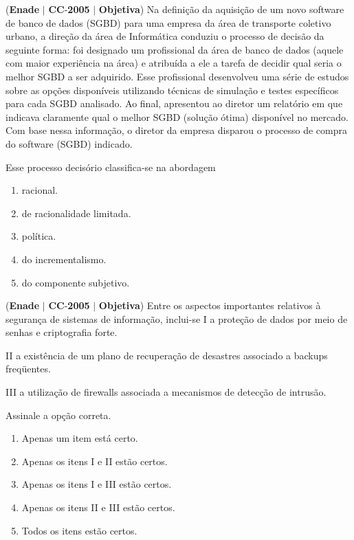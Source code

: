 \documentclass{exam}
\begin{document}
\begin{questions}
\question (\textbf{Enade} $|$ \textbf{CC}-\textbf{2005} $|$ \textbf{Objetiva})
Na definição da aquisição de um novo software de
banco de dados (SGBD) para uma empresa da área de
transporte coletivo urbano, a direção da área de Informática
conduziu o processo de decisão da seguinte forma: foi
designado um profissional da área de banco de dados (aquele
com maior experiência na área) e atribuída a ele a tarefa de
decidir qual seria o melhor SGBD a ser adquirido. Esse
profissional desenvolveu uma série de estudos sobre as opções
disponíveis utilizando técnicas de simulação e testes específicos
para cada SGBD analisado. Ao final, apresentou ao diretor
um relatório em que indicava claramente qual o melhor SGBD
(solução ótima) disponível no mercado. Com base nessa
informação, o diretor da empresa disparou o processo de
compra do software (SGBD) indicado.

Esse processo decisório classifica-se na abordagem
	\begin{enumerate}[label=\alph*)]
		\item  racional.
		\item  de racionalidade limitada.
		\item  política.
		\item  do incrementalismo.
		\item  do componente subjetivo.
	\end{enumerate}

\question (\textbf{Enade} $|$ \textbf{CC}-\textbf{2005} $|$ \textbf{Objetiva})
Entre os aspectos importantes relativos à segurança de sistemas
de informação, inclui-se
I a proteção de dados por meio de senhas e criptografia forte.

II a existência de um plano de recuperação de desastres
associado a backups freqüentes.

III a utilização de firewalls associada a mecanismos de
detecção de intrusão.

Assinale a opção correta.
	\begin{enumerate}[label=\alph*)]
		\item  Apenas um item está certo.
		\item  Apenas os itens I e II estão certos.
		\item  Apenas os itens I e III estão certos.
		\item  Apenas os itens II e III estão certos.
		\item  Todos os itens estão certos.
	\end{enumerate}


\end{questions}
\end{document}
